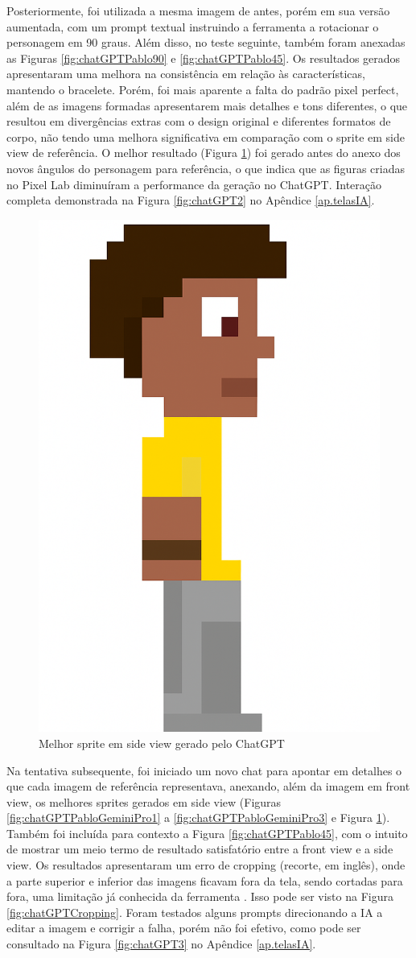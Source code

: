 Posteriormente, foi utilizada a mesma imagem de antes, porém em sua versão aumentada, com um prompt textual instruindo a ferramenta a rotacionar o personagem em 90 graus. Além disso, no teste seguinte, também foram anexadas as Figuras \ref{fig:chatGPTPablo90} e \ref{fig:chatGPTPablo45}. Os resultados gerados apresentaram uma melhora na consistência em relação às características, mantendo o bracelete. Porém, foi mais aparente a falta do padrão pixel perfect, além de as imagens formadas apresentarem mais detalhes e tons diferentes, o que resultou em divergências extras com o design original e diferentes formatos de corpo, não tendo uma melhora significativa em comparação com o sprite em side view de referência. O melhor resultado (Figura \ref{fig:chatGPTSideView}) foi gerado antes do anexo dos novos ângulos do personagem para referência, o que indica que as figuras criadas no Pixel Lab diminuíram a performance da geração no ChatGPT. Interação completa demonstrada na Figura \ref{fig:chatGPT2} no Apêndice \ref{ap.telasIA}. 

\begin{figure}[htbp]
    \centering
    \caption{\small Melhor sprite em side view gerado pelo ChatGPT }
    \label{fig:chatGPTSideView}
    \includegraphics[width=0.3\linewidth]{figs/chatGPT/visao_lateral/res1.png}
\end{figure}

Na tentativa subsequente, foi iniciado um novo chat para apontar em detalhes o que cada imagem de referência representava, anexando, além da imagem em front view, os melhores sprites gerados em side view (Figuras \ref{fig:chatGPTPabloGeminiPro1} a \ref{fig:chatGPTPabloGeminiPro3} e Figura \ref{fig:chatGPTSideView}). Também foi incluída para contexto a Figura \ref{fig:chatGPTPablo45}, com o intuito de mostrar um meio termo de resultado satisfatório entre a front view e a side view. Os resultados apresentaram um erro de cropping (recorte, em inglês), onde a parte superior e inferior das imagens ficavam fora da tela, sendo cortadas para fora, uma limitação já conhecida da ferramenta \cite{openaiImage_2025}. Isso pode ser visto na Figura \ref{fig:chatGPTCropping}. Foram testados alguns prompts direcionando a IA a editar a imagem e corrigir a falha, porém não foi efetivo, como pode ser consultado na Figura \ref{fig:chatGPT3} no Apêndice \ref{ap.telasIA}.

